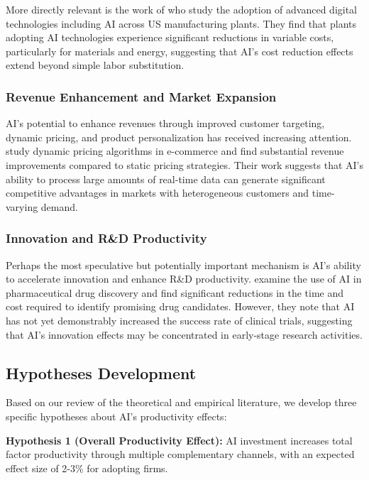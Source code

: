 \documentclass[12pt, a4paper]{article}
\begin{document}
More directly relevant is the work of \citet{zolas2020advanced} who study the adoption of advanced digital technologies including AI across US manufacturing plants. They find that plants adopting AI technologies experience significant reductions in variable costs, particularly for materials and energy, suggesting that AI's cost reduction effects extend beyond simple labor substitution.

\subsubsection{Revenue Enhancement and Market Expansion}

AI's potential to enhance revenues through improved customer targeting, dynamic pricing, and product personalization has received increasing attention. \citet{einav2016real} study dynamic pricing algorithms in e-commerce and find substantial revenue improvements compared to static pricing strategies. Their work suggests that AI's ability to process large amounts of real-time data can generate significant competitive advantages in markets with heterogeneous customers and time-varying demand.

\subsubsection{Innovation and R\&D Productivity}

Perhaps the most speculative but potentially important mechanism is AI's ability to accelerate innovation and enhance R\&D productivity. \citet{cockburn2018impact} examine the use of AI in pharmaceutical drug discovery and find significant reductions in the time and cost required to identify promising drug candidates. However, they note that AI has not yet demonstrably increased the success rate of clinical trials, suggesting that AI's innovation effects may be concentrated in early-stage research activities.

\subsection{Hypotheses Development}

Based on our review of the theoretical and empirical literature, we develop three specific hypotheses about AI's productivity effects:

\textbf{Hypothesis 1 (Overall Productivity Effect):} AI investment increases total factor productivity through multiple complementary channels, with an expected effect size of 2-3\% for adopting firms.
\end{document}
